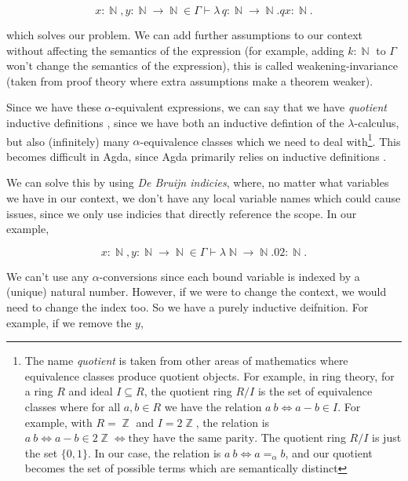 \documentclass[logo,bsc,singlespacing,parskip,online]{infthesis}
\DeclareMathOperator{\nat}{\mathbb{N}}
\DeclareMathOperator{\integer}{\mathbb{Z}}
\begin{document}
\begin{equation*}
  x \colon \nat, y \colon \nat \to \nat \in \Gamma \vdash \lambda \, q \colon \nat \to \nat. q x \colon \nat.
\end{equation*}

which solves our problem. We can add further assumptions to our context without affecting the semantics of the expression (for example, adding $k \colon \nat$ to $\Gamma$ won't change the semantics of the expression), this is called weakening-invariance (taken from proof theory where extra assumptions make a theorem weaker).

Since we have these $\alpha$-equivalent expressions, we can say that we have \textit{quotient} inductive definitions \citep{aydemir_engineering_2008}, since we have both an inductive defintion of the $\lambda$-calculus, but also (infinitely) many $\alpha$-equivalence classes which we need to deal with\footnote{The name \textit{quotient} is taken from other areas of mathematics where equivalence classes produce quotient objects. For example, in ring theory, for a ring $R$ and ideal $I \subseteq R$, the quotient ring $R/I$ is the set of equivalence classes where for all $a, b \in R$ we have the relation $a ~ b \iff a - b \in I$. For example, with $R = \integer$ and $I = 2\integer$, the relation is $a ~ b \iff a - b \in 2\integer \iff \text{they have the same parity}$. The quotient ring $R/I$ is just the set $\{0, 1\}$. In our case, the relation is $a ~ b \iff a =_{\alpha} b$, and our quotient becomes the set of possible terms which are semantically distinct}. This becomes difficult in Agda, since Agda primarily relies on inductive definitions \citep{pitts_locally_2023}.

We can solve this by using \textit{De Bruijn indicies}, where, no matter what variables we have in our context, we don't have any local variable names which could cause issues, since we only use indicies that directly reference the scope. In our example,

\begin{equation*}
  x \colon \nat, y \colon \nat \to \nat \in \Gamma \vdash \lambda \nat \to \nat. 0 2 \colon \nat.
\end{equation*}

We can't use any $\alpha$-conversions since each bound variable is indexed by a (unique) natural number. However, if we were to change the context, we would need to change the index too. So we have a purely inductive deifnition. For example, if we remove the $y$,
\end{document}
